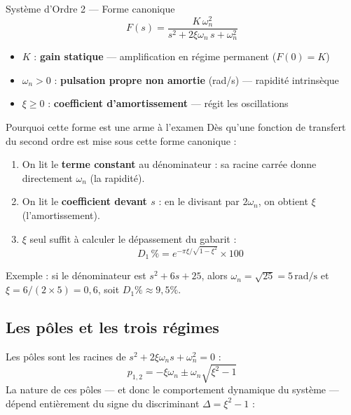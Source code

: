 \documentclass[11pt,a4paper]{report}
\begin{document}
\begin{defbox}{Système d'Ordre 2 — Forme canonique}
\[
  \boxed{F(s) = \frac{K\,\omega_n^2}{s^2 + 2\xi\omega_n\, s + \omega_n^2}}
\]
\begin{itemize}
  \item $K$ : \textbf{gain statique} — amplification en régime permanent ($F(0) = K$)
  \item $\omega_n > 0$ : \textbf{pulsation propre non amortie} (rad/s) — rapidité intrinsèque
  \item $\xi \geq 0$ : \textbf{coefficient d'amortissement} — régit les oscillations
\end{itemize}
\end{defbox}

\begin{importantbox}{Pourquoi cette forme est une arme à l'examen}
  Dès qu'une fonction de transfert du second ordre est mise sous cette forme canonique :
  \begin{enumerate}
    \item On lit le \textbf{terme constant} au dénominateur : sa racine carrée donne directement $\omega_n$ (la rapidité).
    \item On lit le \textbf{coefficient devant $s$} : en le divisant par $2\omega_n$, on obtient $\xi$ (l'amortissement).
    \item $\xi$ seul suffit à calculer le dépassement du gabarit :
    \[
      D_1\,\% = e^{-\pi\xi/\sqrt{1-\xi^2}} \times 100
    \]
  \end{enumerate}
  Exemple : si le dénominateur est $s^2 + 6s + 25$, alors $\omega_n = \sqrt{25} = 5\,\text{rad/s}$ et $\xi = 6/(2\times 5) = 0{,}6$, soit $D_1\% \approx 9{,}5\%$.
\end{importantbox}

\subsection{Les pôles et les trois régimes}

Les pôles sont les racines de $s^2 + 2\xi\omega_n s + \omega_n^2 = 0$ :
\[
  p_{1,2} = -\xi\omega_n \pm \omega_n\sqrt{\xi^2 - 1}
\]
La nature de ces pôles — et donc le comportement dynamique du système — dépend entièrement du signe du discriminant $\Delta = \xi^2 - 1$ :
\end{document}
